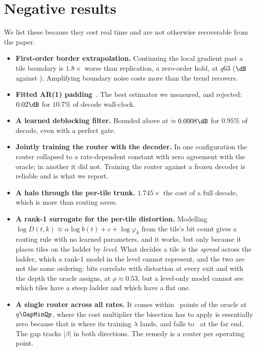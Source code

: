 \section{Negative results}

We list these because they cost real time and are not otherwise recoverable from
the paper.

\begin{itemize}\itemsep2pt
\item \textbf{First-order border extrapolation.} Continuing the local gradient
      past a tile boundary is $1.8\times$ worse than replication, a zero-order
      hold, at
      $q63$ (\SeamLinearHigh$\dB$ against \SeamReplHigh). Amplifying boundary
      noise costs more than the trend recovers.
\item \textbf{Fitted AR(1) padding}~\cite{arls}. The best estimator we measured,
      and rejected: $0.02\dB$ for $10.7\%$ of decode wall-clock.
\item \textbf{A learned deblocking filter.} Bounded above at $\approx 0.0008\dB$ for
      $0.95\%$ of decode, even with a perfect gate.
\item \textbf{Jointly training the router with the decoder.} In one
      configuration the router collapsed to a rate-dependent constant with zero
      agreement with the oracle; in another it did not. Training the router
      against a frozen decoder is reliable and is what we report.
\item \textbf{A halo through the per-tile trunk.} $1.745\times$ the cost of a
      full decode, which is more than routing saves.
\item \textbf{A rank-1 surrogate for the per-tile distortion.} Modelling
      $\log D(t,k)\approx\alpha\log b(t)+c+\log\varphi_k$ from the tile's bit
      count gives a routing rule with no learned parameters, and it works, but
      only because it places tiles on the ladder by \emph{level}. What decides
      a tile is the \emph{spread} across the ladder, which a rank-1
      model in the level cannot represent, and the two are not the same
      ordering: bits correlate with distortion at every exit and with the
      depth the oracle assigns, at $\rho\approx0.53$, but a level-only model
      cannot see which tiles have a steep ladder and which have a flat one.
\item \textbf{A single router across all rates.} It comes within \GapMin\
      points of the oracle at $q\GapMinQp$, where the cost multiplier the
      bisection has to apply is essentially zero because that is where its training $\lambda$
      lands, and falls to \GapMax\ at the far end. The gap tracks $|\beta|$ in
      both directions. The remedy is a router per operating point.
\end{itemize}

